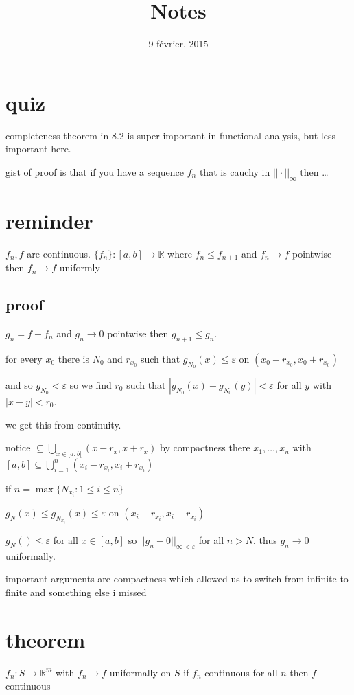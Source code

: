 \documentclass[letterpaper]{article}
\begin{document}
\title{Notes}
\date{9 février, 2015}
\maketitle
\section*{quiz}
completeness theorem in 8.2 is super important in functional analysis, but less important here.

gist of proof is that if you have a sequence $f_n$ that is cauchy in $||\cdot||_{\infty}$ then \dots


\section*{reminder}
$f_n,f$ are continuous. $\{f_n\}:[a,b]\to\mathbb{R}$ where $f_n\le f_{n+1}$ and $f_n\to f$ pointwise then $f_n\to f$ uniformly
\subsection*{proof}
$g_n=f-f_n$ and $g_n\to 0$ pointwise then $g_{n+1}\le g_n$.

for every $x_0$ there is $N_0$ and $r_{x_0}$ such that $g_{N_0}(x)\le \varepsilon$ on $(x_0-r_{x_0},x_0+r_{x_0})$

and so $g_{N_0}< \varepsilon$ so we find $r_0$ such that $|g_{N_0}(x)-g_{N_0}(y)|<\varepsilon$ for all $y$ with $|x-y|<r_0$.

we get this from continuity.

notice $\subseteq \bigcup_{x\in[a,b[}(x-r_x,x+r_x)$
by compactness there $x_1,\dots,x_n$ with $[a,b]\subseteq\bigcup\limits_{i=1}^n(x_i-r_{x_i},x_i+r_{x_i})$

if $n=\max\{N_{x_i}:1\le i\le n\}$

$g_N(x)\le g_{N_{x_i}}(x)\le \varepsilon$ on $(x_i-r_{x_i}, x_i+r_{x_i})$

$g_N()\le \varepsilon$ for all $x\in [a,b]$ so $||g_n-0||_{\infty<\varepsilon}$ for all $n>N$. thus $g_n\to0$ uniformally.

important arguments are compactness which allowed us to switch from infinite to finite and something else i missed

\section*{theorem}
$f_n:S\to \mathbb{R}^m$ with $f_n\to f$ uniformally on $S$ if $f_n$ continuous for all $n$ then $f$ continuous 
\end{document}
